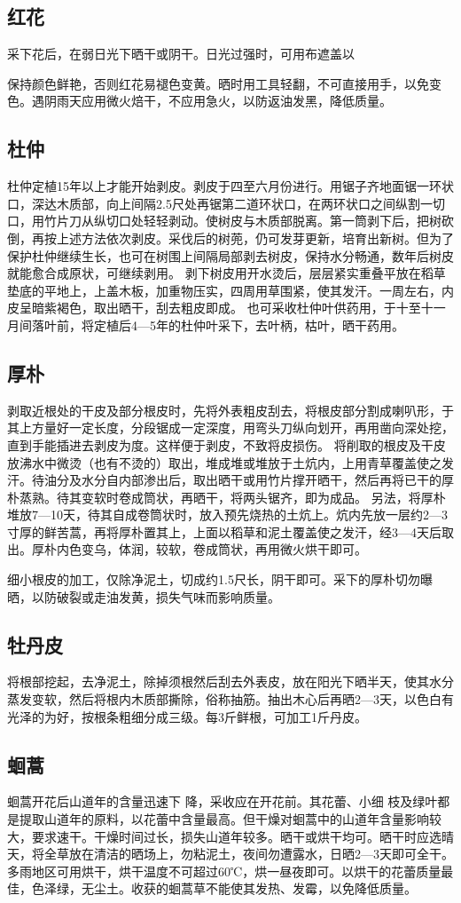 \documentclass{ctexbook}
\begin{document}
\subsection{红花}
采下花后，在弱日光下晒干或阴干。日光过强时，可用布遮盖以

保持颜色鲜艳，否则红花易褪色变黄。晒时用工具轻翻，不可直接用手，以免变色。遇阴雨天应用微火焙干，不应用急火，以防返油发黑，降低质量。
\subsection{杜仲}
杜仲定植15年以上才能开始剥皮。剥皮于四至六月份进行。用锯子齐地面锯一环状口，深达木质部，向上间隔2.5尺处再锯第二道环状口，在两环状口之间纵割一切口，用竹片刀从纵切口处轻轻剥动。使树皮与木质部脱离。第一筒剥下后，把树砍倒，再按上述方法依次剥皮。采伐后的树蔸，仍可发芽更新，培育出新树。但为了保护杜仲继续生长，也可在树围上间隔局部剥去树皮，保持水分畅通，数年后树皮就能愈合成原状，可继续剥用。
剥下树皮用开水烫后，层层紧实重叠平放在稻草垫底的平地上，上盖木板，加重物压实，四周用草围紧，使其发汗。一周左右，内皮呈暗紫褐色，取出晒干，刮去粗皮即成。
也可采收杜仲叶供药用，于十至十一月间落叶前，将定植后4—5年的杜仲叶采下，去叶柄，枯叶，晒干药用。
\subsection{厚朴}
剥取近根处的干皮及部分根皮时，先将外表粗皮刮去，将根皮部分割成喇叭形，于其上方量好一定长度，分段锯成一定深度，用弯头刀纵向划开，再用凿向深处挖，直到手能插进去剥皮为度。这样便于剥皮，不致将皮损伤。
将削取的根皮及干皮放沸水中微烫（也有不烫的）取出，堆成堆或堆放于土炕内，上用青草覆盖使之发汗。待油分及水分自内部渗出后，取出晒干或用竹片撑开晒干，然后再将已干的厚朴蒸熟。待其变软时卷成筒状，再晒干，将两头锯齐，即为成品。
另法，将厚朴堆放7—10天，待其自成卷筒状时，放入预先烧热的土炕上。炕内先放一层约2—3寸厚的鲜苦蒿，再将厚朴置其上，上面以稻草和泥土覆盖使之发汗，经3—4天后取出。厚朴内色变乌，体润，较软，卷成筒状，再用微火烘干即可。

细小根皮的加工，仅除净泥土，切成约1.5尺长，阴干即可。采下的厚朴切勿曝晒，以防破裂或走油发黄，损失气味而影响质量。
\subsection{牡丹皮}
将根部挖起，去净泥土，除掉须根然后刮去外表皮，放在阳光下晒半天，使其水分蒸发变软，然后将根内木质部撕除，俗称抽筋。抽出木心后再晒2—3天，以色白有光泽的为好，按根条粗细分成三级。每3斤鲜根，可加工1斤丹皮。
\subsection{蛔蒿}
蛔蒿开花后山道年的含量迅速下
降，采收应在开花前。其花蕾、小细
枝及绿叶都是提取山道年的原料，以花蕾中含量最高。但干燥对蛔蒿中的山道年含量影响较大，要求速干。干燥时间过长，损失山道年较多。晒干或烘干均可。晒干时应选晴天，将全草放在清洁的晒场上，勿粘泥土，夜间勿遭露水，日晒2—3天即可全干。多雨地区可用烘干，烘干温度不可超过60℃，烘一昼夜即可。以烘干的花蕾质量最佳，色泽绿，无尘土。收获的蛔蒿草不能使其发热、发霉，以免降低质量。
\end{document}
